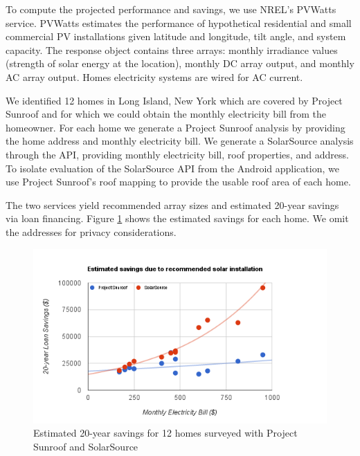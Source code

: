 \documentclass[pageno]{jpaper}
\begin{document}
To compute the projected performance and savings, we use NREL's PVWatts service. PVWatts estimates the performance of hypothetical residential and small commercial PV installations given latitude and longitude, tilt angle, and system capacity. The response object contains three arrays: monthly irradiance values (strength of solar energy at the location), monthly DC array output, and monthly AC array output. Homes electricity systems are wired for AC current.

We identified 12 homes in Long Island, New York which are covered by Project Sunroof and for which we could obtain the monthly electricity bill from the homeowner. For each home we generate a Project Sunroof analysis by providing the home address and monthly electricity bill. We generate a SolarSource analysis through the API, providing monthly electricity bill, roof properties, and address. To isolate evaluation of the SolarSource API from the Android application, we use Project Sunroof's roof mapping to provide the usable roof area of each home. 

The two services yield recommended array sizes and estimated 20-year savings via loan financing. Figure \ref{fig:loan-savings} shows the estimated savings for each home. We omit the addresses for privacy considerations.

\begin{figure}[h]
\begin{center}
\includegraphics[scale=0.7] {loan-savings}
\caption{Estimated 20-year savings for 12 homes surveyed with Project Sunroof and SolarSource}
\label{fig:loan-savings}
\end{center}
\end{figure}
\end{document}
